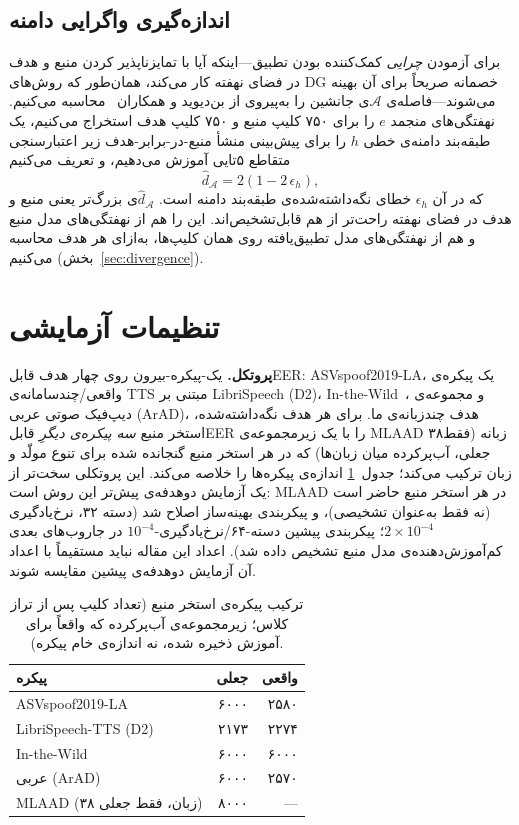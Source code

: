 \documentclass[a4paper,11pt]{article}
\begin{document}
\subsection{اندازه‌گیری واگرایی دامنه}
\label{sec:method-divergence}
برای آزمودن \emph{چرایی} کمک‌کننده بودن تطبیق---اینکه آیا با تمایزناپذیر
کردن منبع و هدف در فضای نهفته کار می‌کند، همان‌طور که روش‌های DG خصمانه
صریحاً برای آن بهینه می‌شوند---فاصله‌ی $\mathcal{A}$ی جانشین را به‌پیروی از
بن‌دیوید و همکاران~\cite{bendavid} محاسبه می‌کنیم. نهفتگی‌های منجمد $e$ را
برای ۷۵۰ کلیپ منبع و ۷۵۰ کلیپ هدف استخراج می‌کنیم، یک طبقه‌بند دامنه‌ی خطی
$h$ را برای پیش‌بینی منشأ منبع-در-برابر-هدف زیر اعتبارسنجی متقاطع ۵تایی
آموزش می‌دهیم، و تعریف می‌کنیم
\begin{equation}
\hat d_{\mathcal{A}} = 2\left(1-2\,\epsilon_h\right),
\end{equation}
که در آن $\epsilon_h$ خطای نگه‌داشته‌شده‌ی طبقه‌بند دامنه است. $\hat
d_{\mathcal{A}}$ی بزرگ‌تر یعنی منبع و هدف در فضای نهفته راحت‌تر از هم
قابل‌تشخیص‌اند. این را هم از نهفتگی‌های مدل منبع و هم از نهفتگی‌های مدل
تطبیق‌یافته روی همان کلیپ‌ها، به‌ازای هر هدف محاسبه می‌کنیم
(بخش~\ref{sec:divergence}).

\section{تنظیمات آزمایشی}
\textbf{پروتکل.} یک-پیکره-بیرون روی چهار هدف قابل‌EER: ASVspoof2019-LA، یک
پیکره‌ی واقعی/چندسامانه‌ی TTS مبتنی بر LibriSpeech (D2)، In-the-Wild~\cite{itw}،
و مجموعه‌ی دیپ‌فیک صوتی عربی (ArAD)، هدف چندزبانه‌ی ما. برای هر هدف
نگه‌داشته‌شده، استخر منبع \emph{سه پیکره‌ی دیگرِ} قابل‌EER را با یک زیرمجموعه‌ی
MLAAD ۳۸‌زبانه (فقط جعلی، آب‌پرکرده میان زبان‌ها) که در هر استخر منبع
گنجانده شده برای تنوع مولّد و زبان ترکیب می‌کند؛ جدول~\ref{tab:datastats}
اندازه‌ی پیکره‌ها را خلاصه می‌کند. این پروتکلی سخت‌تر از یک آزمایش دوهدفه‌ی
پیش‌تر این روش است: MLAAD در هر استخر منبع حاضر است (نه فقط به‌عنوان
تشخیصی)، و پیکربندی بهینه‌ساز اصلاح شد (دسته ۳۲، نرخ‌یادگیری
$2\times10^{-4}$؛ پیکربندی پیشین دسته-۶۴/نرخ‌یادگیری-$10^{-4}$ در
جاروب‌های بعدی کم‌آموزش‌دهنده‌ی مدل منبع تشخیص داده شد). اعداد این مقاله
نباید مستقیماً با اعداد آن آزمایش دوهدفه‌ی پیشین مقایسه شوند.

\begin{table}[t]
\centering
\caption{ترکیب پیکره‌ی استخر منبع (تعداد کلیپ پس از تراز کلاس؛ زیرمجموعه‌ی
آب‌پرکرده که واقعاً برای آموزش ذخیره شده، نه اندازه‌ی خام پیکره).}
\label{tab:datastats}
\begin{tabular}{@{}lrr@{}}
\toprule
پیکره & جعلی & واقعی \\
\midrule
ASVspoof2019-LA & ۶۰۰۰ & ۲۵۸۰ \\
LibriSpeech-TTS (D2) & ۲۱۷۳ & ۲۲۷۴ \\
In-the-Wild & ۶۰۰۰ & ۶۰۰۰ \\
عربی (ArAD) & ۶۰۰۰ & ۲۵۷۰ \\
MLAAD (۳۸ زبان، فقط جعلی) & ۸۰۰۰ & --- \\
\bottomrule
\end{tabular}
\end{table}
\end{document}
